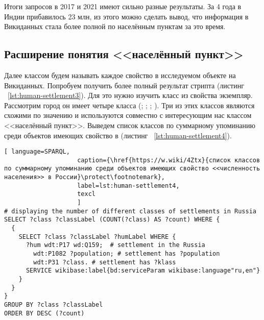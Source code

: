 Итоги запросов в 2017 и 2021 имеют сильно разные результаты. За 4 года в Индии прибавилось 23 млн, из этого можно сделать вывод, что информация в Викиданных стала более полной по населённым пунктам за это время.

\subsection{Расширение понятия <<населённый пункт>>}

Далее классом будем называть каждое свойство  в исследуемом объекте на Викиданных. Попробуем получить более полный результат стрипта (листинг ~\protect\ref{lst:human-settlement3}). Для это нужно изучить класс  из свойства экземпляр. Рассмотрим город  он имеет четыре класса (; ; ; ). Три из этих классов являются схожими по значению и используются совместно с интересующим нас классом <<населённый пункт>>. Выведем список классов по суммарному упоминанию среди объектов имеющих свойство  в  (листинг ~\protect\ref{lst:human-settlement4}).

\begin{lstlisting}[ language=SPARQL, 
                    caption={\href{https://w.wiki/4Ztx}{список классов по суммарному упоминанию среди объектов имеющих свойство <<численность населения>> в России}\protect\footnotemark},
                    label=lst:human-settlement4,
                    texcl 
                    ]
# displaying the number of different classes of settlements in Russia
SELECT ?class ?classLabel (COUNT(?class) AS ?count) WHERE {
  {
    SELECT ?class ?classLabel ?humLabel WHERE {
      ?hum wdt:P17 wd:Q159;  # settlement in the Russia
        wdt:P1082 ?population; # settlement has ?population
        wdt:P31 ?class. # settlement has ?klass
      SERVICE wikibase:label{bd:serviceParam wikibase:language"ru,en"}
    }
  }
}
GROUP BY ?class ?classLabel
ORDER BY DESC (?count)
\end{lstlisting}%


